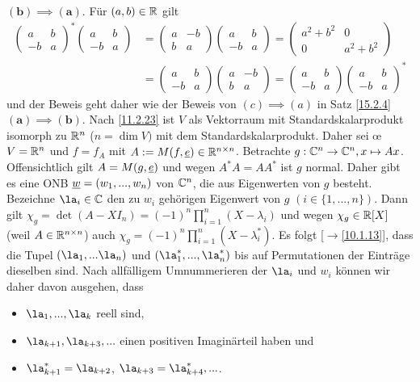 \documentclass[../../main.tex]{subfiles}
\begin{document}
\begin{cproof}
$\boldsymbol{(b)\implies (a)}$. Für $(a,b)\in \mathbb R$ gilt
\begin{align*}
\begin{pmatrix*}a&b\\-b&a\end{pmatrix*}^*\begin{pmatrix*}a&b\\-b&a\end{pmatrix*}&=\begin{pmatrix*}a&-b\\b&a\end{pmatrix*}\begin{pmatrix*}a&b\\-b&a\end{pmatrix*}=\begin{pmatrix*}a^2+b^2&0\\0&a^2+b^2\end{pmatrix*}\\
&=\begin{pmatrix*}a&b\\-b&a\end{pmatrix*}\begin{pmatrix*}a&-b\\b&a\end{pmatrix*}=\begin{pmatrix*}a&b\\-b&a\end{pmatrix*}\begin{pmatrix*}a&b\\-b&a\end{pmatrix*}^*
\end{align*}
und der Beweis geht daher wie der Beweis von $(c)\implies (a)$ in Satz \ref{15.2.4}\\
		
$\boldsymbol{(a)\implies (b)}$. Nach \ref{11.2.23} ist $V$ als Vektorraum mit Standardskalarprodukt isomorph zu $\mathbb R^n$ ($n=\dim V)$ mit dem Standardskalarprodukt. Daher sei \oe $V=\mathbb R^n$ und $f=f_A$ mit $A:=M(f,{\underline e})\in \mathbb R^{n\times n}$. Betrachte $g: \mathbb C^n\to \mathbb C^n,  x\mapsto Ax$. Offensichtlich gilt $A=M(g,{\underline e})$ und wegen $A^*A=AA^*$ ist $g$ normal. Daher gibt es eine ONB ${\underline w}=(w_1,...,w_n)$ von $\mathbb C^n$, die aus Eigenwerten von $g$ besteht. Bezeichne $\la_i\in \C$ den zu $w_i$ gehörigen Eigenwert von $g$ $(i\in\{1,...,n\})$. Dann gilt $\chi_g=\det(A-XI_n)=(-1)^n\prod_{i=1}^n(X-\lambda_i)$ und wegen $\chi_g\in \mathbb R[X]$ (weil $A\in \mathbb R^{n\times n}$) auch $\chi_g=(-1)^n\prod_{i=1}^n(X-\lambda_i^*)$. Es folgt [$\to$\ref{10.1.13}], dass die Tupel $(\la_1,...\la_n)$ und $(\la_1^*,...,\la_n^*)$ bis auf Permutationen der Einträge dieselben sind. Nach allfälligem Umnummerieren der $\la_i$ und $w_i$ können wir daher davon ausgehen, dass
\begin{itemize}
\item $\la_1,...,\la_k$ reell sind,
\item $\la_{k+1},\la_{k+3},...$ einen positiven Imaginärteil haben und
\item $\la_{k+1}^*=\la_{k+2}$, $\la_{k+3}=\la_{k+4}^*,...$.
\end{itemize}
		

\end{cproof}
\end{document}
